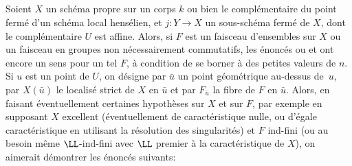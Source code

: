 \subsection{} \label{XIV.6.2}
Soient $X$ un sch\'ema propre sur un corps $k$ ou bien le compl\'ementaire du point ferm\'e d'un sch\'ema local hens\'elien, et $j:Y \to X$ un sous-sch\'ema ferm\'e de $X$, dont le compl\'ementaire $U$ est affine. Alors, si $F$ est un faisceau d'ensembles sur $X$ ou un faisceau en groupes non n\'ecessairement commutatifs, les \'enonc\'es  ou  et  ont encore un sens pour un tel $F$, \`a condition de se borner \`a des petites valeurs de $n$. Si $u$ est un point de $U$, on d\'esigne par $\bar{u}$ un point g\'eom\'etrique au-dessus de~$u$, par $X(\bar{u})$ le localis\'e strict de $X$ en $\bar{u}$ et par $F_{\bar{u}}$ la fibre de $F$ en $\bar{u}$. Alors, en faisant \'eventuellement certaines hypoth\`eses sur $X$ et sur $F$, par exemple en supposant $X$ excellent (\'eventuellement de caract\'eristique nulle, ou d'\'egale caract\'eristique en utilisant la r\'esolution des singularit\'es) et $F$ ind-fini (ou au besoin m\^eme $\LL$-ind-fini avec $\LL$ premier \`a la caract\'eristique de $X$), on aimerait d\'emontrer les \'enonc\'es suivants:
